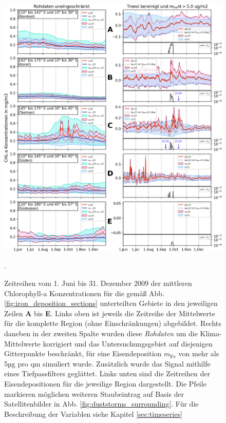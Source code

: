 \documentclass[12pt,a4paper,onecolumn]{scrartcl}
\begin{document}
\begin{figure}
\includegraphics[width=\textwidth]{bilder/timeseries_all.png}
\caption{Zeitreihen vom 1. Juni bis 31. Dezember 2009 der mittleren Chlorophyll-a Konzentrationen für die gemäß Abb. \ref{fig:iron_deposition_sections} unterteilten Gebiete in den jeweiligen Zeilen \textbf{A} bis \textbf{E}. Links oben ist jeweils die Zeitreihe der Mittelwerte für die komplette Region (ohne Einschränkungen) abgebildet. Rechts daneben in der zweiten Spalte wurden diese \textit{Rohdaten} um die Klima-Mittelwerte korrigiert und das Untersuchungsgebiet auf diejenigen Gitterpunkte beschränkt, für eine Eisendeposition $m_\text{Fe}$ von mehr als 5µg pro qm simuliert wurde. Zusätzlich wurde das Signal mithilfe eines Tiefpassfilters geglättet. Links unten sind die Zeitreihen der Eisendepositionen für die jeweilige Region dargestellt. Die Pfeile markieren möglichen weiteren Staubeintrag auf Basis der Satellitenbilder in Abb. \ref{fig:duststorms_surrounding}. Für die Beschreibung der Variablen siehe Kapitel \ref{sec:timeseries}}. \label{fig:timeseries_full}
\end{figure}
\end{document}
